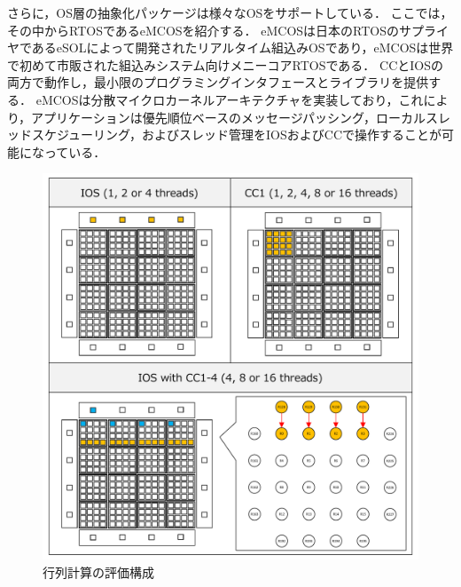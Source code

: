 \documentclass[submit,techrep]{ipsj_v2/UTF8/ipsj}
\begin{document}
さらに，OS層の抽象化パッケージは様々なOSをサポートしている．
ここでは，その中からRTOSであるeMCOSを紹介する．
eMCOSは日本のRTOSのサプライヤであるeSOLによって開発されたリアルタイム組込みOSであり，eMCOSは世界で初めて市販された組込みシステム向けメニーコアRTOSである．
CCとIOSの両方で動作し，最小限のプログラミングインタフェースとライブラリを提供する．
eMCOSは分散マイクロカーネルアーキテクチャを実装しており，これにより，アプリケーションは優先順位ベースのメッセージパッシング，ローカルスレッドスケジューリング，およびスレッド管理をIOSおよびCCで操作することが可能になっている．




\begin{figure}[t]
  \centering
  \includegraphics[width=0.8\linewidth]{../figure/matrix_calculation.pdf}
  \caption{\label{fig:mat_calc}
    行列計算の評価構成}
\end{figure}
\end{document}

